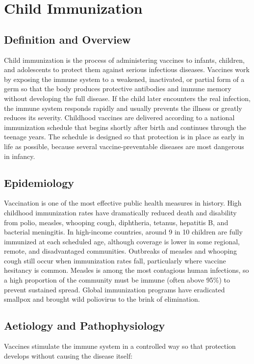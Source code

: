 \chapter{Child Immunization}

\section*{Definition and Overview}
Child immunization is the process of administering vaccines to infants, children, and adolescents to protect them against serious infectious diseases. Vaccines work by exposing the immune system to a weakened, inactivated, or partial form of a germ so that the body produces protective antibodies and immune memory without developing the full disease. If the child later encounters the real infection, the immune system responds rapidly and usually prevents the illness or greatly reduces its severity. Childhood vaccines are delivered according to a national immunization schedule that begins shortly after birth and continues through the teenage years. The schedule is designed so that protection is in place as early in life as possible, because several vaccine-preventable diseases are most dangerous in infancy.

\section*{Epidemiology}
Vaccination is one of the most effective public health measures in history. High childhood immunization rates have dramatically reduced death and disability from polio, measles, whooping cough, diphtheria, tetanus, hepatitis B, and bacterial meningitis. In high-income countries, around 9 in 10 children are fully immunized at each scheduled age, although coverage is lower in some regional, remote, and disadvantaged communities. Outbreaks of measles and whooping cough still occur when immunization rates fall, particularly where vaccine hesitancy is common. Measles is among the most contagious human infections, so a high proportion of the community must be immune (often above 95\%) to prevent sustained spread. Global immunization programs have eradicated smallpox and brought wild poliovirus to the brink of elimination.

\section*{Aetiology and Pathophysiology}
Vaccines stimulate the immune system in a controlled way so that protection develops without causing the disease itself:

